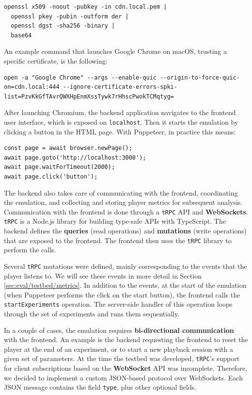 \begin{verbatim}
openssl x509 -noout -pubkey -in cdn.local.pem |
  openssl pkey -pubin -outform der |
  openssl dgst -sha256 -binary |
  base64
\end{verbatim}

An example command that launches Google Chrome on macOS, trusting a specific certificate, is the following:

\begin{verbatim}
open -a "Google Chrome" --args --enable-quic --origin-to-force-quic-on=cdn.local:444 --ignore-certificate-errors-spki-list=PzvKkGfTAvrQWXHpEnmXssTywk7rHhscPwokTCMqtyg=
\end{verbatim}

After launching Chromium, the backend application navigates to the frontend user interface, which is exposed on \texttt{localhost}. Then it starts the emulation by clicking a button in the HTML page. With Puppeteer, in practice this means:

\begin{verbatim}
const page = await browser.newPage();
await page.goto('http://localhost:3000');
await page.waitForTimeout(2000);
await page.click('button');
\end{verbatim}

The backend also takes care of communicating with the frontend, coordinating the emulation, and collecting and storing player metrics for subsequent analysis. Communication with the frontend is done through a \texttt{tRPC} API and \textbf{WebSockets}. \texttt{tRPC} is a Node.js library for building type-safe APIs with TypeScript. The backend defines the \textbf{queries} (read operations) and \textbf{mutations} (write operations) that are exposed to the frontend. The frontend then uses the \texttt{tRPC} library to perform the calls.

Several \texttt{tRPC} mutations were defined, mainly corresponding to the events that the player listens to. We will see these events in more detail in Section \ref{sec:eval/testbed/metrics}. In addition to the events, at the start of the emulation (when Puppeteer performs the click on the start button), the frontend calls the \texttt{startExperiments} operation. The server-side handler of this operation loops through the set of experiments and runs them sequentially.

In a couple of cases, the emulation requires \textbf{bi-directional communication} with the frontend. An example is the backend requesting the frontend to reset the player at the end of an experiment, or to start a new playback session with a given set of parameters. At the time the testbed was developed, \texttt{tRPC}'s support for client subscriptions based on the \textbf{WebSocket} API was incomplete. Therefore, we decided to implement a custom JSON-based protocol over WebSockets. Each JSON message contains the field \texttt{type}, plus other optional fields.

